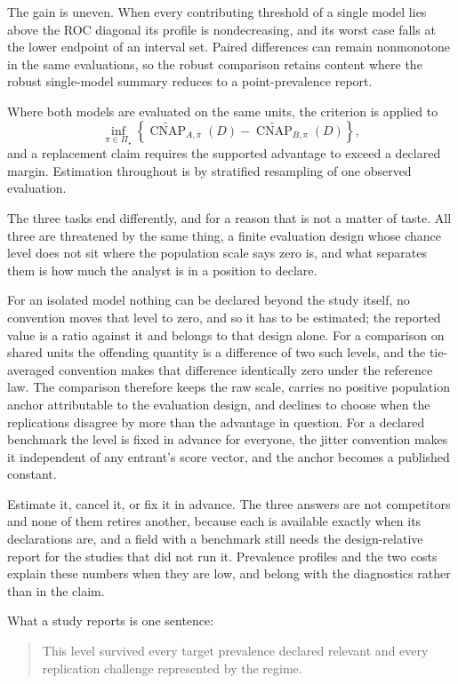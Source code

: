 \documentclass[11pt]{article}
\newcommand{\CNAP}{\operatorname{CNAP}}
\newcommand{\PSet}{\Pi_\star}
\newcommand{\CNAPta}{\widetilde{\CNAP}}
\theoremstyle{remark}
\begin{document}
The gain is uneven. When every contributing threshold of a single model lies above the ROC diagonal its profile is nondecreasing, and its worst case falls at the lower endpoint of an interval set. Paired differences can remain nonmonotone in the same evaluations, so the robust comparison retains content where the robust single-model summary reduces to a point-prevalence report.

Where both models are evaluated on the same units, the criterion is applied to
\[
\inf_{\pi\in\PSet}
\left\{
\CNAPta_{A,\pi}(D)-\CNAPta_{B,\pi}(D)
\right\},
\]
and a replacement claim requires the supported advantage to exceed a declared margin. Estimation throughout is by stratified resampling of one observed evaluation.

The three tasks end differently, and for a reason that is not a matter of taste. All three are threatened by the same thing, a finite evaluation design whose chance level does not sit where the population scale says zero is, and what separates them is how much the analyst is in a position to declare.

For an isolated model nothing can be declared beyond the study itself, no convention moves that level to zero, and so it has to be estimated; the reported value is a ratio against it and belongs to that design alone. For a comparison on shared units the offending quantity is a difference of two such levels, and the tie-averaged convention makes that difference identically zero under the reference law. The comparison therefore keeps the raw scale, carries no positive population anchor attributable to the evaluation design, and declines to choose when the replications disagree by more than the advantage in question. For a declared benchmark the level is fixed in advance for everyone, the jitter convention makes it independent of any entrant's score vector, and the anchor becomes a published constant.

Estimate it, cancel it, or fix it in advance. The three answers are not competitors and none of them retires another, because each is available exactly when its declarations are, and a field with a benchmark still needs the design-relative report for the studies that did not run it. Prevalence profiles and the two costs explain these numbers when they are low, and belong with the diagnostics rather than in the claim.

What a study reports is one sentence:

\begin{quote}
This level survived every target prevalence declared relevant and every replication challenge represented by the regime.
\end{quote}
\end{document}
